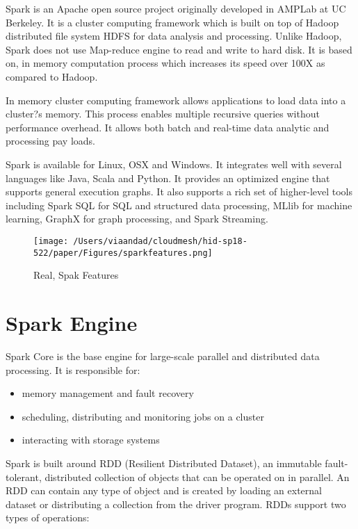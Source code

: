 \documentclass{paper}
\begin{document}
Spark is an Apache open source project originally developed in AMPLab at UC Berkeley. It is a cluster computing framework which is built on top of Hadoop distributed file system HDFS for data analysis and processing. Unlike Hadoop, Spark does not use Map-reduce engine to read and write to hard disk. It is based on, in memory computation process which increases its speed over 100X as compared to Hadoop.\hfill\break


In memory cluster computing framework allows applications to load data into a cluster?s memory. This process enables multiple recursive queries without performance overhead. It allows both batch and real-time data analytic and processing pay loads.\hfill\break


Spark is available for Linux, OSX and Windows. It integrates well with several languages like Java, Scala and Python. It provides an optimized engine that supports general execution graphs. It also supports a rich set of higher-level tools including Spark SQL for SQL and structured data processing, MLlib for machine learning, GraphX for graph processing, and Spark Streaming.\hfill\break


\begin{figure}[H]
	\centering
	\texttt{[image: /Users/viaandad/cloudmesh/hid-sp18-522/paper/Figures/sparkfeatures.png]}
	\caption[Optional caption]{Real, Spak Features \cite{ref:feature}}
	\label{fig:sparkfeatures}
\end{figure}
\newpage
\section{Spark Engine}
Spark Core is the base engine for large-scale parallel and distributed data processing. It is responsible for: \hfill\break

\begin{itemize}
   \item  memory management and fault recovery
   \item  scheduling, distributing and monitoring jobs on a cluster
   \item  interacting with storage systems
\end{itemize}

Spark is built around  RDD (Resilient Distributed Dataset), an immutable fault-tolerant, distributed collection of objects that can be operated on in parallel. An RDD can contain any type of object and is created by loading an external dataset or distributing a collection from the driver program.
RDDs support two types of operations:\cite{ref:topal}\hfill\break
\end{document}
